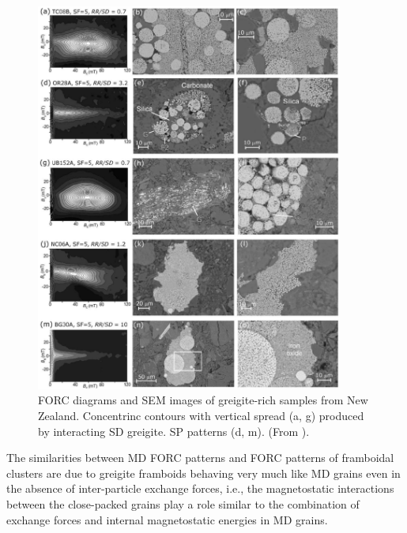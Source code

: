 \begin{figure}
\centering
\includegraphics[width=0.9\textwidth]{research-4/figs/Rowan2006.pdf}
\caption[FORC diagrams and SEM images of greigite-rich samples from New Zealand]{FORC diagrams and SEM images of greigite-rich samples from New Zealand. Concentrinc contours with vertical spread (a, g) produced by interacting SD greigite. SP patterns (d, m). (From \citet{Rowan2006}).}
\label{FIG_F06_Rowan2006}
\end{figure}\par

The similarities between MD FORC patterns and FORC patterns of framboidal clusters are due to greigite framboids behaving very much like MD grains even in the absence of inter-particle exchange forces, i.e., the magnetostatic interactions between the close-packed grains play a role similar to the combination of exchange forces and internal magnetostatic energies in MD grains.\par

